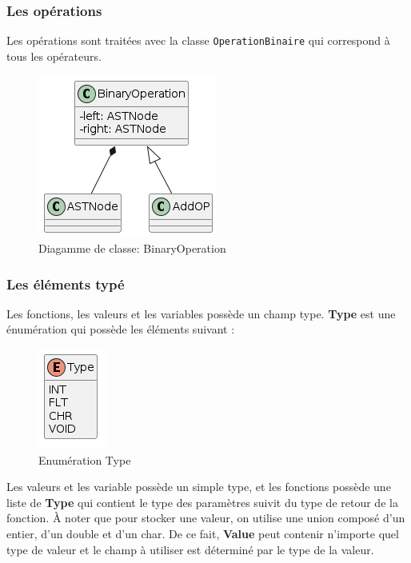 \documentclass[a4paper]{article}%
\begin{document}

\subsubsection*{Les opérations}

Les opérations sont traitées avec la classe \lstinline{OperationBinaire} qui
correspond à tous les opérateurs.

\begin{figure}[h!]
  \begin{center}
  \includegraphics[scale=0.5]{../ressources/diagrams/binaryOp.png}
  \caption{Diagamme de classe: BinaryOperation}
  \end{center}
\end{figure}

\clearpage{}
\subsubsection*{Les éléments typé}
\label{sec:eltTypes}

Les fonctions, les valeurs et les variables possède un champ type. \textbf{Type}
est une énumération qui possède les éléments suivant :

\begin{figure}[h!]
  \begin{center}
  \includegraphics[scale=0.5]{../ressources/diagrams/Type.png}
  \caption{Enumération Type}
  \end{center}
\end{figure}

Les valeurs et les variable possède un simple type, et les fonctions possède une
liste de \textbf{Type} qui contient le type des paramètres suivit du type de
retour de la fonction. À noter que pour stocker une valeur, on utilise une union
composé d'un entier, d'un double et d'un char. De ce fait, \textbf{Value} peut
contenir n'importe quel type de valeur et le champ à utiliser est déterminé par
le type de la valeur.
\end{document}
